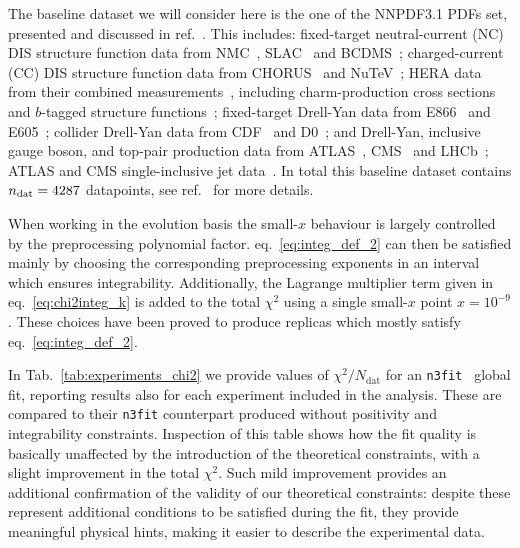 %
The baseline dataset we will consider here is the one of the NNPDF3.1 PDFs set, presented and discussed in ref.~\cite{Ball:2017nwa}.
This includes: fixed-target neutral-current 
(NC) DIS structure function data from NMC~\cite{Arneodo:1996kd,Arneodo:1996qe}, 
SLAC~\cite{Whitlow:1991uw} and BCDMS~\cite{Benvenuti:1989rh}; charged-current 
(CC) DIS structure function data from CHORUS~\cite{Onengut:2005kv} and 
NuTeV~\cite{Goncharov:2001qe,Mason:2006qa}; HERA data from their combined 
measurements~\cite{Abramowicz:2015mha}, including charm-production cross 
sections~\cite{Abramowicz:1900rp} and $b$-tagged structure 
functions~\cite{Aaron:2009af,Abramowicz:2014zub}; fixed-target Drell-Yan data 
from E866~\cite{Webb:2003ps,Webb:2003bj,Towell:2001nh} and 
E605~\cite{Moreno:1990sf}; collider Drell-Yan data from 
CDF~\cite{Aaltonen:2010zza} and D0~\cite{Abazov:2007jy,
Abazov:2013rja,D0:2014kma}; and Drell-Yan, inclusive gauge boson, and top-pair
production data from 
ATLAS~\cite{Aad:2013iua,Aad:2014qja,Aad:2011dm,Aaboud:2016btc,Aad:2015auj,
Aad:2014kva,Aaboud:2016pbd,Aad:2015mbv}, CMS~\cite{Chatrchyan:2012xt,
Chatrchyan:2013mza,Chatrchyan:2013tia,Khachatryan:2016pev,Khachatryan:2015oaa,
Khachatryan:2016mqs,Khachatryan:2015uqb,Khachatryan:2015oqa} 
and LHCb~\cite{Aaij:2012vn,Aaij:2012mda,Aaij:2015gna,Aaij:2015zlq};
ATLAS and CMS single-inclusive jet data~\cite{Aad:2014vwa, Khachatryan:2015luy}.
In total this baseline dataset contains $n_{\rm dat}=4287$
datapoints, see ref.~\cite{Ball:2017nwa} for more details.

%
When working in the evolution basis the small-$x$ behaviour is largely controlled by the preprocessing
polynomial factor. eq.~\eqref{eq:integ_def_2}
can then be satisfied mainly by choosing the corresponding preprocessing exponents in an interval which ensures integrability.
Additionally, the Lagrange multiplier term given in eq.~\eqref{eq:chi2integ_k} is added to the
total $\chi^2$ using a single small-$x$ point $x=10^{-9}$. These choices have been proved to
produce replicas which mostly satisfy eq.~\eqref{eq:integ_def_2}. 

%
In Tab.~\ref{tab:experiments_chi2} we provide values of $\chi^2/N_{\text{dat}}$ for an {\tt n3fit } global fit,
reporting results also for each experiment included in the analysis.
These are compared to their {\tt n3fit} counterpart produced without positivity and integrability constraints. 
Inspection of this table shows how the fit quality is basically unaffected by the introduction of the
theoretical constraints, with a slight improvement in the total $\chi^2$. Such mild improvement provides an
additional confirmation of the validity of our theoretical constraints: despite these represent additional 
conditions to be satisfied during the fit, they provide meaningful physical hints, making it easier to describe 
the experimental data.
 
